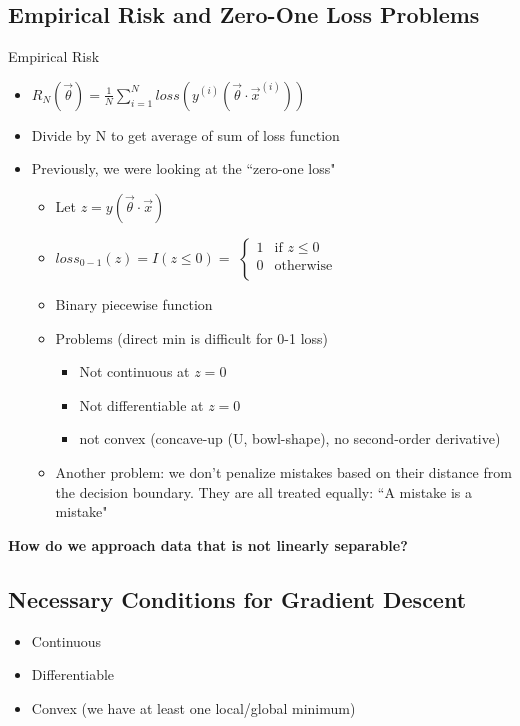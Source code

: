 \documentclass[10pt, oneside]{article}
\begin{document}
\subsection{Empirical Risk and Zero-One Loss Problems}
Empirical Risk
\begin{itemize}
    \item $R_N (\vec \theta) = \frac{1}{N} \sum_{i=1} ^N loss(y^{(i)}(\vec \theta \cdot \vec x ^{(i)}))$
    \item Divide by N to get average of sum of loss function
    \item Previously, we were looking at the ``zero-one loss"
    \begin{itemize}
        \item Let $z=y(\vec \theta \cdot \vec x)$
        \item $loss_{0-1} (z) = I(z\leq 0)= $ $ \begin{cases} 
          1 & \text{if } z \leq 0 \\
         0 & \text{otherwise} \\
        \end{cases}$
        \item Binary piecewise function
        \item Problems (direct min is difficult for 0-1 loss)
        \begin{itemize}
            \item Not continuous at $z=0$
            \item Not differentiable at $z=0$
            \item not convex (concave-up (U, bowl-shape), no second-order derivative)
        \end{itemize}
        \item Another problem: we don't penalize mistakes based on their distance from the decision boundary. They are all treated equally: ``A mistake is a mistake"
    \end{itemize}
\end{itemize}

\textbf{How do we approach data that is not linearly separable?}
\subsection{Necessary Conditions for Gradient Descent}
\begin{itemize}
    \item Continuous
    \item Differentiable
    \item Convex (we have at least one local/global minimum)
\end{itemize}
\end{document}
